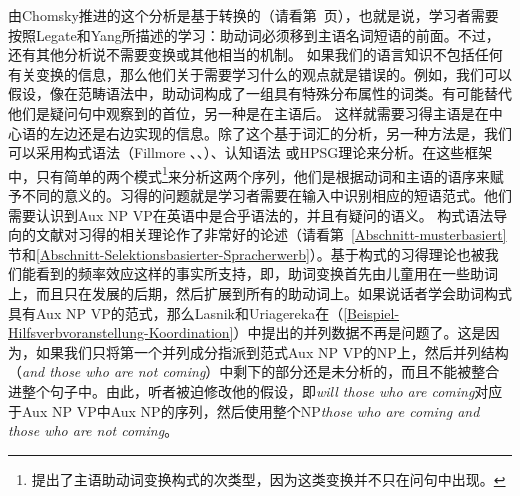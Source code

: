 \noindent
由Chomsky推进的这个分析是基于转换的（请看第~\pageref{Seite-GB-Entscheidungsfragen-Englisch}页），也就是说，学习者需要按照Legate和Yang所描述的学习：助动词必须移到主语名词短语的前面。不过，还有其他分析说不需要变换或其他相当的机制。
如果我们的语言知识不包括任何有关变换的信息，那么他们关于需要学习什么的观点就是错误的。例如，我们可以假设，像在范畴语法中，助动词构成了一组具有特殊分布属性的词类。有可能替代他们是疑问句中观察到的首位，另一种是在主语后\citep[]{Villavicencio2002a}。
这样就需要习得主语是在中心语的左边还是右边实现的信息。除了这个基于词汇的分析，另一种方法是，我们可以采用构式语法（Fillmore \citeyear[]{Fillmore88a}、\citeyear{Fillmore99a}、\citealp[]{KF99a}）、认知语法 \citep[Chapter~9]{Dabrowska2004a}或HPSG理论\indexhpsg \citep{GSag2000a-u}来分析。在这些框架中，只有简单的两个模式\footnote{
	\citet{Fillmore99a}提出了主语助动词变换构式的次类型，因为这类变换并不只在问句中出现。
}来分析这两个序列，他们是根据动词和主语的语序来赋予不同的意义的。习得的问题就是学习者需要在输入中识别相应的短语范式。他们需要认识到Aux NP VP在英语中是合乎语法的，并且有疑问的语义。
构式语法导向的文献对习得的相关理论作了非常好的论述（请看第~\ref{Abschnitt-musterbasiert}节和\ref{Abschnitt-Selektionsbasierter-Spracherwerb}）。基于构式的习得理论也被我们能看到的频率效应这样的事实所支持，即，助词变换首先由儿童用在一些助词上，而且只在发展的后期，然后扩展到所有的助动词上。如果说话者学会助词构式具有Aux NP VP的范式，那么Lasnik和Uriagereka在（\ref{Beispiel-Hilfsverbvoranstellung-Koordination}）中提出的并列数据不再是问题了。这是因为，如果我们只将第一个并列成分指派到范式Aux NP VP的NP上，然后并列结构（\emph{and those who are not coming}）中剩下的部分还是未分析的，而且不能被整合进整个句子中。由此，听者被迫修改他的假设，即\emph{will those who are coming}对应于Aux NP VP中Aux NP的序列，然后使用整个NP\emph{those who are coming and those who are not coming}。
